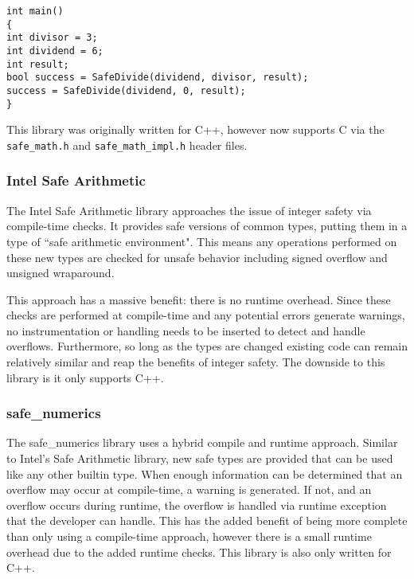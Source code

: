 \begin{flushleft}
\begin{minipage}{\linewidth}
\texttt{int main()\\
\{\\
\hspace*{1.5em}int divisor = 3;\\
\hspace*{1.5em}int dividend = 6;\\
\hspace*{1.5em}int result;\\
\hspace*{1.5em}bool success = SafeDivide(dividend, divisor, result);\\
\hspace*{1.5em}success = SafeDivide(dividend, 0, result);\\
\}
}
\end{minipage}
\end{flushleft}


This library was originally written for C++, however now supports C via the \texttt{safe\_math.h} and \texttt{safe\_math\_impl.h} header files.

\subsubsection{Intel Safe Arithmetic}

The Intel Safe Arithmetic library approaches the issue of integer safety via compile-time checks. It provides safe versions of common types, putting them in a type of ``safe arithmetic environment". This means any operations performed on these new types are checked for unsafe behavior including signed overflow and unsigned wraparound.

This approach has a massive benefit: there is no runtime overhead. Since these checks are performed at compile-time and any potential errors generate warnings, no instrumentation or handling needs to be inserted to detect and handle overflows. Furthermore, so long as the types are changed existing code can remain relatively similar and reap the benefits of integer safety. The downside to this library is it only supports C++.

\subsubsection{safe\_numerics}

The safe\_numerics library uses a hybrid compile and runtime approach. Similar to Intel's Safe Arithmetic library, new safe types are provided that can be used like any other builtin type. When enough information can be determined that an overflow may occur at compile-time, a warning is generated. If not, and an overflow occurs during runtime, the overflow is handled via runtime exception that the developer can handle. This has the added benefit of being more complete than only using a compile-time approach, however there is a small runtime overhead due to the added runtime checks. This library is also only written for C++.

